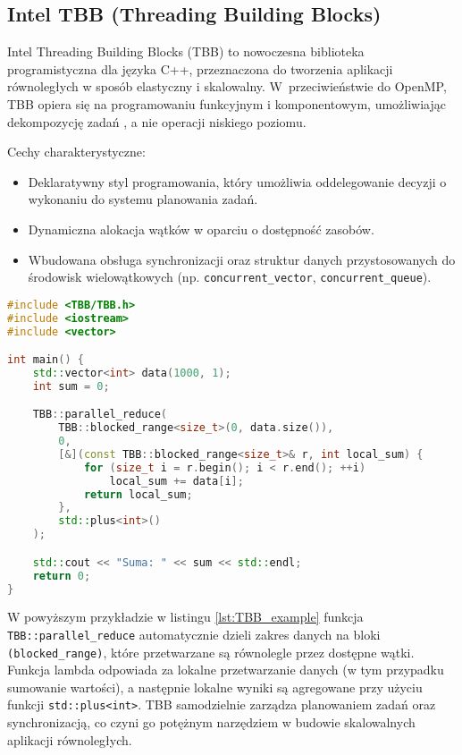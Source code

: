 \subsection{Intel TBB (Threading Building Blocks)}
Intel Threading Building Blocks (TBB) to nowoczesna biblioteka programistyczna dla języka C++, przeznaczona do tworzenia aplikacji równoległych w sposób elastyczny i skalowalny. W~przeciwieństwie do OpenMP, TBB opiera się na programowaniu funkcyjnym i komponentowym, umożliwiając dekompozycję zadań , a nie operacji niskiego poziomu.

Cechy charakterystyczne:
\begin{itemize}
    \item Deklaratywny styl programowania, który umożliwia oddelegowanie decyzji o wykonaniu do systemu planowania zadań.
    \item Dynamiczna alokacja wątków w oparciu o dostępność zasobów.
    \item Wbudowana obsługa synchronizacji oraz struktur danych przystosowanych do środowisk wielowątkowych (np. \texttt{concurrent\_vector}, \texttt{concurrent\_queue}).
\end{itemize}

\begin{lstlisting}[language=C++, style=VS2017,  caption={Przykład użycia Intel TBB w C++}, label={lst:TBB_example}]
#include <TBB/TBB.h>
#include <iostream>
#include <vector>

int main() {
    std::vector<int> data(1000, 1);
    int sum = 0;

    TBB::parallel_reduce(
        TBB::blocked_range<size_t>(0, data.size()),
        0,
        [&](const TBB::blocked_range<size_t>& r, int local_sum) {
            for (size_t i = r.begin(); i < r.end(); ++i)
                local_sum += data[i];
            return local_sum;
        },
        std::plus<int>()
    );

    std::cout << "Suma: " << sum << std::endl;
    return 0;
}
\end{lstlisting}
W powyższym przykładzie w listingu \ref{lst:TBB_example} funkcja \texttt{TBB::parallel\_reduce} automatycznie dzieli zakres danych na bloki \texttt{(blocked\_range)}, które przetwarzane są równolegle przez dostępne wątki. Funkcja lambda odpowiada za lokalne przetwarzanie danych (w tym przypadku sumowanie wartości), a następnie lokalne wyniki są agregowane przy użyciu funkcji \texttt{std::plus<int>}. TBB samodzielnie zarządza planowaniem zadań oraz synchronizacją, co czyni go potężnym narzędziem w budowie skalowalnych aplikacji równoległych.

